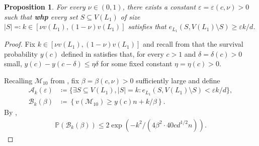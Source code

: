 \documentclass[reqno,final,a4paper]{amsart}
\newtheorem{proposition}[thm]{Proposition}
\theoremstyle{definition}
\newcommand{\cM}{\mathcal{M}}
\def\eps{\varepsilon}
\newcommand{\1}{\mathbbm{1}}
\begin{document}
\begin{proposition}\label{prop: expansion large}
For every $\nu\in (0,1)$, there exists a constant $\eps = \eps(c,\nu)>0$ such that \textbf{whp} every set $S\subseteq V(L_1)$ of size $|S|\eqqcolon k\in [\nu v(L_1),(1-\nu)v(L_1)]$ satisfies that $e_{L_1}(S,V(L_1)\setminus S)\ge \eps k/d$.
\end{proposition}
\begin{proof}
Fix $k\in [\nu v(L_1),(1-\nu)v(L_1)]$ and recall from  that the survival probability $y(c)$ defined in  satisfies that, for every $c>1$ and $\delta=\delta(c)>0$ small, $y(c)-y(c-\delta)\le \eta \delta$ for some fixed constant $\eta = \eta(c)>0$.

Recalling $\cM_{10}$ from , fix $\beta = \beta(c,\nu)>0$ sufficiently large and define
\begin{align*}
    \mathcal{A}_k(\eps)&\coloneqq\{\exists S\subseteq V(L_1), |S|=k\colon e_{L_1}(S,V(L_1)\setminus S)<\eps k/d\},\\
    \mathcal{B}_k(\beta)&\coloneqq\left\{v(\cM_{10})\ge y(c)n+k/\beta\right\}.
\end{align*}
By ,
\begin{align}
    \mathbb{P}\left(\mathcal{B}_k(\beta)\right)\le 2\exp(-k^2/(4\beta^2\cdot 40cd^{1/2}n)).\label{eq: bk}
\end{align}


\end{proof}
\end{document}

